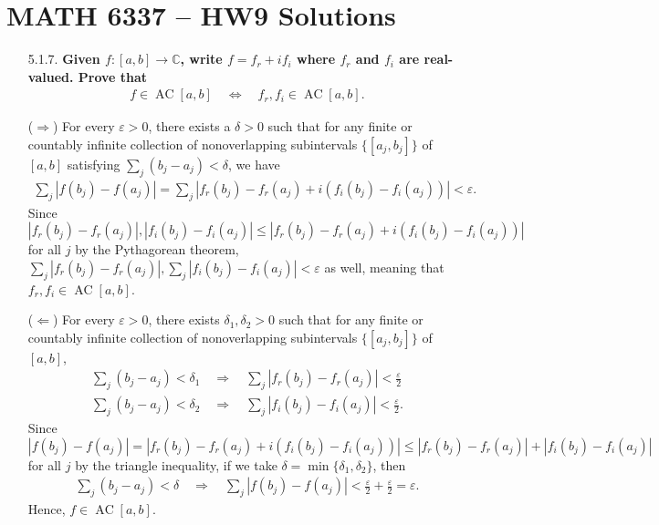 \documentclass[a4paper,12pt]{article}
\DeclareMathOperator*{\AC}{AC}
\begin{document}
\section*{MATH 6337 -- HW9 Solutions}
\begin{enumerate}
    \item[5.1.7.]
        \boldmath\textbf{Given $f : [a, b] \to \mathbb{C}$, write $f = f_r + if_i$ where $f_r$ and $f_i$ are real-valued. Prove that
        \begin{align*}
            f \in \AC[a, b] \quad\Longleftrightarrow\quad f_r, f_i \in \AC[a, b].
        \end{align*}
        }\unboldmath \par
        ($\Rightarrow$) For every $\varepsilon > 0$, there exists a $\delta > 0$ such that for any finite or countably infinite collection of nonoverlapping subintervals $\{[a_j, b_j]\}$ of $[a, b]$ satisfying $\sum_j (b_j - a_j) < \delta$, we have
        \begin{align*}
             \sum_j |f(b_j) - f(a_j)| = \sum_j |f_r(b_j) - f_r(a_j) + i(f_i(b_j) - f_i(a_j))| < \varepsilon.
        \end{align*}
        Since $|f_r(b_j) - f_r(a_j)|, |f_i(b_j) - f_i(a_j)| \leq |f_r(b_j) - f_r(a_j) + i(f_i(b_j) - f_i(a_j))|$ for all $j$ by the Pythagorean theorem, $\sum_j |f_r(b_j) - f_r(a_j)|, \sum_j|f_i(b_j) - f_i(a_j)| < \varepsilon$ as well, meaning that $f_r, f_i \in \AC[a, b]$. \par
        ($\Leftarrow$) For every $\varepsilon > 0$, there exists $\delta_1, \delta_2 > 0$ such that for any finite or countably infinite collection of nonoverlapping subintervals $\{[a_j, b_j]\}$ of $[a, b]$,
        \begin{gather*}
            \sum_j (b_j - a_j) < \delta_1 \quad\Longrightarrow\quad \sum_j |f_r(b_j) - f_r(a_j)| < \frac{\varepsilon}{2} \\
            \sum_j (b_j - a_j) < \delta_2 \quad\Longrightarrow\quad \sum_j |f_i(b_j) - f_i(a_j)| < \frac{\varepsilon}{2}.
        \end{gather*}
        Since $|f(b_j) - f(a_j)| = |f_r(b_j) - f_r(a_j) + i(f_i(b_j) - f_i(a_j))| \leq |f_r(b_j) - f_r(a_j)| + |f_i(b_j) - f_i(a_j)|$ for all $j$ by the triangle inequality, if we take $\delta = \min\{ \delta_1, \delta_2 \}$, then
        \begin{gather*}
            \sum_j (b_j - a_j) < \delta \quad\Longrightarrow\quad \sum_j |f(b_j) - f(a_j)| < \frac{\varepsilon}{2} + \frac{\varepsilon}{2} = \varepsilon.
        \end{gather*}
        Hence, $f \in \AC[a, b]$.


\end{enumerate}
\end{document}
